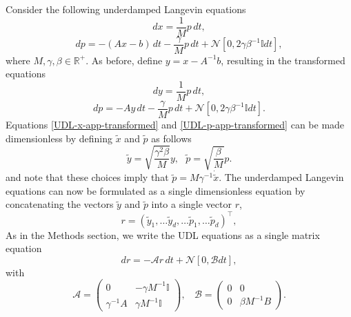 \documentclass[prx,onecolumn,floatfix,longbibliography,notitlepage, nofootinbib]{revtex4-1}
\begin{document}
\begin{appendix}
Consider the following underdamped Langevin equations
\begin{equation}
\label{UDL-x-app}
    dx  = \frac{1}{M} p \, dt,
\end{equation}
\begin{equation}
\label{UDL-p-app}
    dp = -(A x - b) \, dt- \frac{\gamma}{M} p \, dt + \mathcal{N}[0,2 \gamma \beta^{-1}  \mathbb{I} dt],
\end{equation}
where $M, \gamma, \beta \in \mathbb{R}^+$. As before, define $y = x - A^{-1} b$, resulting in the transformed equations
\begin{equation}
\label{UDL-x-app-transformed}
    dy  = \frac{1}{M} p \, dt,
\end{equation}
\begin{equation}
\label{UDL-p-app-transformed}
    dp = -A y \, dt- \frac{\gamma}{M}p \, dt + \mathcal{N}[0,2 \gamma \beta^{-1} \mathbb{I} dt].
\end{equation}
Equations \eqref{UDL-x-app-transformed} and \eqref{UDL-p-app-transformed} can be made dimensionless by defining $\tilde{x}$ and $\tilde{p}$ as follows
\begin{equation}
    \tilde{y} =\sqrt{\frac{\gamma^2 \beta}{M}}y, \: \: \: \tilde{p} = \sqrt{\frac{\beta}{M}}p.
\end{equation}
and note that these choices imply that $\tilde{p} = M \gamma^{-1} \dot{\tilde{x}}$. The underdamped Langevin equations can now be formulated as a single dimensionless equation by concatenating the vectors $\tilde{y}$ and $\tilde{p}$ into a single vector $r$,
\begin{equation}
\label{r-def-app}
    r = \left(\tilde{y}_1, \dots \tilde{y}_d, \dots \tilde{p}_1, \dots \tilde{p}_d\right)^\intercal,
\end{equation}
As in the Methods section, we write the UDL equations as a single matrix equation
\begin{equation}
    dr = -\mathcal{A} r\, dt + \mathcal{N}[0, \mathcal{B} dt],
\end{equation}
with
\begin{equation}
    \mathcal{A} = \begin{pmatrix}
    0 & -\gamma M^{-1}\mathbb{I} \\
    \gamma^{-1}A & \gamma M^{-1} \mathbb{I}
    \end{pmatrix}, \: \: \: \:
    \mathcal{B} = \begin{pmatrix}
    0 & 0  \\
    0 & \beta M^{-1} B
    \end{pmatrix}.

\end{equation}
\end{appendix}
\end{document}
